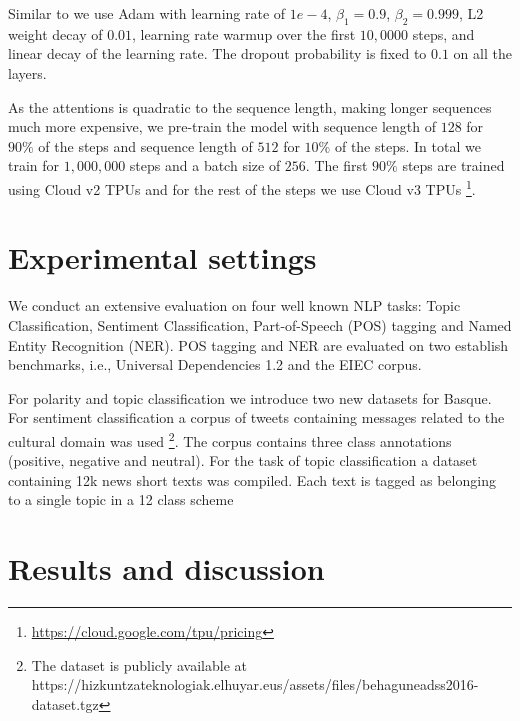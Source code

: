 \documentclass[10pt, a4paper]{article}
\begin{document}
Similar to \cite{devlin2019bert} we use Adam with learning rate of $1e-4$, $\beta_1=0.9$, $\beta_2=0.999$, L2 weight decay of $0.01$, learning rate warmup over the first $10,0000$ steps, and linear decay of the learning rate. The dropout probability is fixed to $0.1$ on all the layers. 

As the attentions is quadratic to the sequence length, making longer sequences much more expensive, we pre-train the model with sequence length of $128$ for $90\%$ of the steps and sequence length of $512$ for $10\%$ of the steps. In total we train for $1,000,000$ steps and a batch size of $256$. The first $90\%$ steps are trained using Cloud v2 TPUs and for the rest of the steps we use Cloud v3 TPUs \footnote{\url{https://cloud.google.com/tpu/pricing}}. 

\section{Experimental settings}\label{sec:exper-sett}



We conduct an extensive evaluation on four well known NLP tasks: Topic Classification, Sentiment Classification, Part-of-Speech (POS) tagging and Named Entity Recognition (NER). POS tagging and NER are evaluated on two establish benchmarks, i.e., Universal Dependencies 1.2 and the EIEC corpus.

For polarity and topic classification we introduce two new datasets for Basque. For sentiment classification a corpus of tweets containing messages related to the cultural domain was used \cite{san2019multilingual}\footnote{The dataset is publicly available at https://hizkuntzateknologiak.elhuyar.eus/assets/files/behaguneadss2016-dataset.tgz}. The corpus contains three class annotations (positive, negative and neutral). For the task of topic classification a dataset containing 12k news short texts was compiled. Each text is tagged as belonging to a single topic in a 12 class scheme



\section{Results and discussion}\label{sec:results-discussion}
\end{document}
